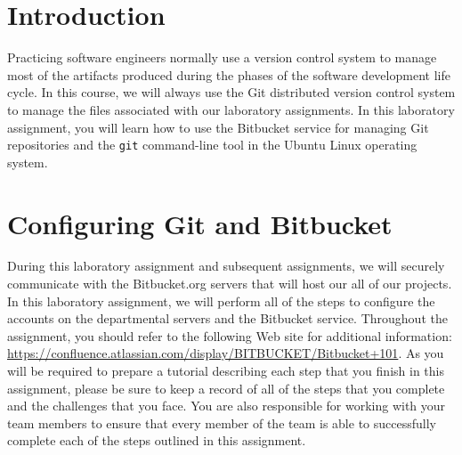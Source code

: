 


\usepackage[compact]{titlesec}



\section*{Introduction}

Practicing software engineers normally use a version control system to manage most of the artifacts produced during the
phases of the software development life cycle.  In this course, we will always use the Git distributed version control
system to manage the files associated with our laboratory assignments.  In this laboratory assignment, you will learn
how to use the Bitbucket service for managing Git repositories and the {\tt git} command-line tool in the Ubuntu Linux
operating system.

\section*{Configuring Git and Bitbucket}

During this laboratory assignment and subsequent assignments, we will securely communicate with the Bitbucket.org
servers that will host our all of our projects.  In this laboratory assignment, we will perform all of the steps to
configure the accounts on the departmental servers and the Bitbucket service.  Throughout the assignment, you should
refer to the following Web site for additional information:
\url{https://confluence.atlassian.com/display/BITBUCKET/Bitbucket+101}.  As you will be required to prepare a tutorial
describing each step that you finish in this assignment, please be sure to keep a record of all of the steps that you
complete and the challenges that you face.  You are also responsible for working with your team members to ensure that
every member of the team is able to successfully complete each of the steps outlined in this assignment.

